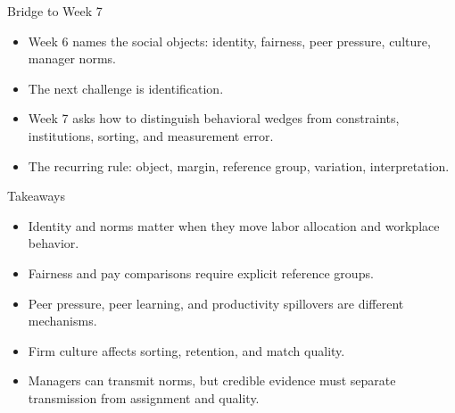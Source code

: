 \documentclass[aspectratio=169,11pt]{beamer}
\begin{document}
\begin{frame}{Bridge to Week 7}
\begin{itemize}
    \item Week 6 names the social objects: identity, fairness, peer pressure, culture, manager norms.
    \item The next challenge is identification.
    \item Week 7 asks how to distinguish behavioral wedges from constraints, institutions, sorting, and measurement error.
    \item The recurring rule: object, margin, reference group, variation, interpretation.
\end{itemize}
\end{frame}

\begin{frame}{Takeaways}
\begin{itemize}
    \item Identity and norms matter when they move labor allocation and workplace behavior.
    \item Fairness and pay comparisons require explicit reference groups.
    \item Peer pressure, peer learning, and productivity spillovers are different mechanisms.
    \item Firm culture affects sorting, retention, and match quality.
    \item Managers can transmit norms, but credible evidence must separate transmission from assignment and quality.
\end{itemize}
\end{frame}
\end{document}
